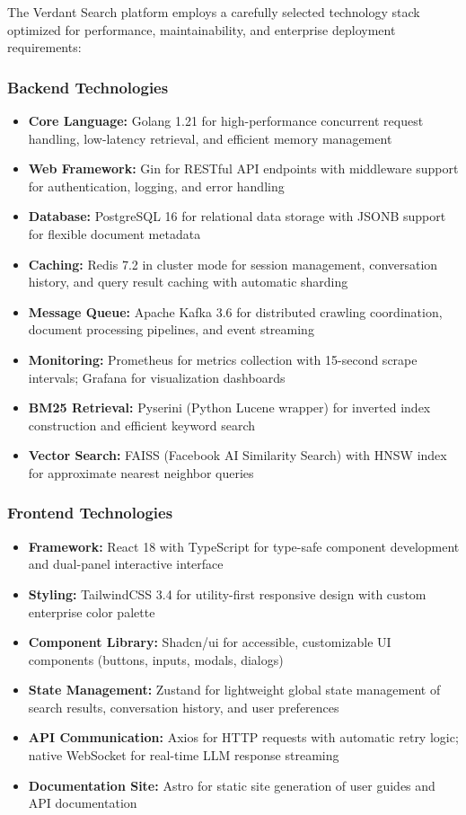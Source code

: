 The Verdant Search platform employs a carefully selected technology stack optimized for performance, maintainability, and enterprise deployment requirements:

\subsubsection{Backend Technologies}
\begin{itemize}
    \item \textbf{Core Language:} Golang 1.21 for high-performance concurrent request handling, low-latency retrieval, and efficient memory management
    \item \textbf{Web Framework:} Gin for RESTful API endpoints with middleware support for authentication, logging, and error handling
    \item \textbf{Database:} PostgreSQL 16 for relational data storage with JSONB support for flexible document metadata
    \item \textbf{Caching:} Redis 7.2 in cluster mode for session management, conversation history, and query result caching with automatic sharding
    \item \textbf{Message Queue:} Apache Kafka 3.6 for distributed crawling coordination, document processing pipelines, and event streaming
    \item \textbf{Monitoring:} Prometheus for metrics collection with 15-second scrape intervals; Grafana for visualization dashboards
    \item \textbf{BM25 Retrieval:} Pyserini (Python Lucene wrapper) for inverted index construction and efficient keyword search
    \item \textbf{Vector Search:} FAISS (Facebook AI Similarity Search) with HNSW index for approximate nearest neighbor queries
\end{itemize}

\subsubsection{Frontend Technologies}
\begin{itemize}
    \item \textbf{Framework:} React 18 with TypeScript for type-safe component development and dual-panel interactive interface
    \item \textbf{Styling:} TailwindCSS 3.4 for utility-first responsive design with custom enterprise color palette
    \item \textbf{Component Library:} Shadcn/ui for accessible, customizable UI components (buttons, inputs, modals, dialogs)
    \item \textbf{State Management:} Zustand for lightweight global state management of search results, conversation history, and user preferences
    \item \textbf{API Communication:} Axios for HTTP requests with automatic retry logic; native WebSocket for real-time LLM response streaming
    \item \textbf{Documentation Site:} Astro for static site generation of user guides and API documentation
\end{itemize}

